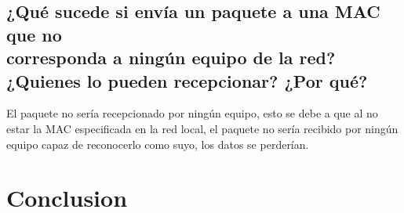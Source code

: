 \documentclass{udpreport}
\begin{document}
\section{¿Qué sucede si envía un paquete a una MAC que no\\ corresponda a ningún equipo
de la red? ¿Quienes lo pueden recepcionar? ¿Por qué?}
El paquete no sería recepcionado por ningún equipo, esto se debe a que al no estar la MAC especificada en la red local, el paquete no sería recibido por ningún equipo capaz de reconocerlo como suyo, los datos se perderían.

\chapter{Conclusion}
\end{document}
